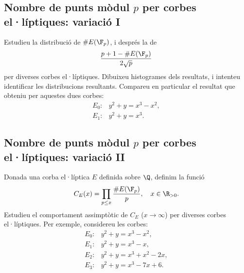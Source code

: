  \subsection{Nombre de punts mòdul \texorpdfstring{$p$}{p} per corbes el·líptiques: variació I}
 Estudieu la distribució de $\#E(\F_p)$, i després la de
 \[
 \frac{p+1 - \#E(\F_p)}{2\sqrt{p}}
 \]
 per diverses corbes el·líptiques. Dibuixeu histogrames dels resultats, i intenteu identificar les distribucions resultants. Compareu en particular el resultat que obteniu per aquestes dues corbes:
 \begin{align*}
     E_0\colon & y^2 + y = x^3 - x^2,\\
     E_1\colon & y^2 + y = x^3.
 \end{align*}
 \subsection{Nombre de punts mòdul \texorpdfstring{$p$}{p} per corbes el·líptiques: variació II}
 Donada una corba el·líptica $E$ definida sobre $\Q$, definim la funció
 \[
 C_E(x) = \prod_{p\leq x}\frac{\#E(\F_p)}{p},\quad x\in\R_{>0}.
 \]
 Estudieu el comportament assimptòtic de $C_E$ ($x\to\infty$) per diverses corbes el·líptiques. Per exemple, considereu les corbes:
 \begin{align*}
E_0\colon& y^2+y=x^3-x^2,\\
E_1\colon& y^2+y=x^3-x,\\
E_2\colon& y^2+y = x^3+x^2-2x,\\
E_3\colon&y^2 +y =x^3 - 7x+6.
\end{align*}
